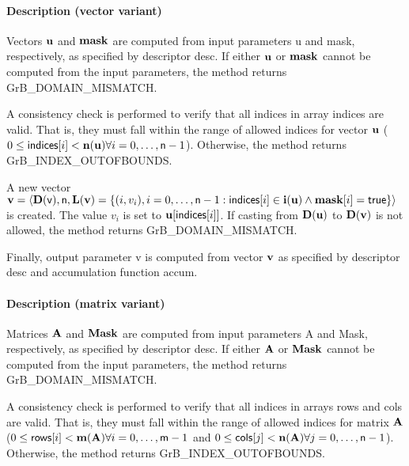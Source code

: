 \paragraph{Description (vector variant)}

Vectors ${\bf u}$ and ${\bf mask}$ are computed from input
parameters {\sf u} and {\sf mask}, respectively, as specified by
descriptor {\sf desc}.  If either ${\bf u}$ or ${\bf mask}$
cannot be computed from the input parameters, the method returns {\sf
GrB\_DOMAIN\_MISMATCH}.

A consistency check is performed to verify that all indices in array
{\sf indices} are valid. That is, they must fall within the range of allowed
indices for vector ${\bf u}$ ($0 \leq {\sf indices}[i] < \bold{n}({\bf u})
\forall i = 0,\ldots,{\sf n}-1$).  Otherwise, the method returns {\sf
GrB\_INDEX\_OUTOFBOUNDS}.

A new vector ${\bf v} = \langle \bold{D}({\sf v}),{\sf n},
\bold{L}({\bf v}) = \{ (i,v_i), i = 0,\ldots,{\sf n}-1 : {\sf indices}[i]
\in \bold{i}({\bf u}) \wedge {\bf mask}[i] = {\sf true} \} \rangle$
is created.  The value $v_i$ is set to ${\bf u}[{\sf indices}[i]]$. If
casting from $\bold{D}({\bf u})$ to $\bold{D}({\bf v})$ is not
allowed, the method returns {\sf GrB\_DOMAIN\_MISMATCH}.

Finally, output parameter {\sf v} is computed from vector ${\bf v}$ as
specified by descriptor {\sf desc} and accumulation function {\sf accum}.

\paragraph{Description (matrix variant)}

Matrices ${\bf A}$ and ${\bf Mask}$ are computed from input
parameters {\sf A} and {\sf Mask}, respectively, as specified by
descriptor {\sf desc}.  If either ${\bf A}$ or ${\bf Mask}$
cannot be computed from the input parameters, the method returns {\sf
GrB\_DOMAIN\_MISMATCH}.

A consistency check is performed to verify that all indices in arrays
{\sf rows} and {\sf cols} are valid. That is, they must fall within the range of allowed
indices for matrix ${\bf A}$ ($0 \leq {\sf rows}[i] < \bold{m}({\bf A})
\forall i = 0,\ldots,{\sf m}-1$ and
$0 \leq {\sf cols}[j] < \bold{n}({\bf A}) \forall j = 0,\ldots,{\sf n}-1$).  Otherwise, the method returns {\sf
GrB\_INDEX\_OUTOFBOUNDS}.

